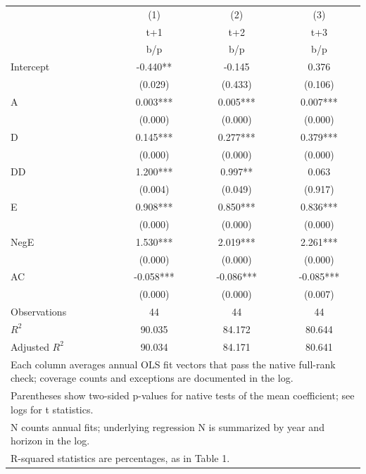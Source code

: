 {
\def\sym#1{\ifmmode^{#1}\else\(^{#1}\)\fi}
\begin{tabular}{l*{3}{c}}
\hline\hline
                    &\multicolumn{1}{c}{(1)}&\multicolumn{1}{c}{(2)}&\multicolumn{1}{c}{(3)}\\
                    &\multicolumn{1}{c}{t+1}&\multicolumn{1}{c}{t+2}&\multicolumn{1}{c}{t+3}\\
                    &         b/p   &         b/p   &         b/p   \\
\hline
Intercept           &      -0.440** &      -0.145   &       0.376   \\
                    &     (0.029)   &     (0.433)   &     (0.106)   \\
A                   &       0.003***&       0.005***&       0.007***\\
                    &     (0.000)   &     (0.000)   &     (0.000)   \\
D                   &       0.145***&       0.277***&       0.379***\\
                    &     (0.000)   &     (0.000)   &     (0.000)   \\
DD                  &       1.200***&       0.997** &       0.063   \\
                    &     (0.004)   &     (0.049)   &     (0.917)   \\
E                   &       0.908***&       0.850***&       0.836***\\
                    &     (0.000)   &     (0.000)   &     (0.000)   \\
NegE                &       1.530***&       2.019***&       2.261***\\
                    &     (0.000)   &     (0.000)   &     (0.000)   \\
AC                  &      -0.058***&      -0.086***&      -0.085***\\
                    &     (0.000)   &     (0.000)   &     (0.007)   \\
\hline
Observations        &          44   &          44   &          44   \\
\(R^{2}\)           &      90.035   &      84.172   &      80.644   \\
Adjusted \(R^{2}\)  &      90.034   &      84.171   &      80.641   \\
\hline\hline
\multicolumn{4}{l}{\footnotesize Each column averages annual OLS fit vectors that pass the native full-rank check; coverage counts and exceptions are documented in the log.}\\
\multicolumn{4}{l}{\footnotesize Parentheses show two-sided p-values for native tests of the mean coefficient; see logs for t statistics.}\\
\multicolumn{4}{l}{\footnotesize N counts annual fits; underlying regression N is summarized by year and horizon in the log.}\\
\multicolumn{4}{l}{\footnotesize R-squared statistics are percentages, as in Table 1.}\\
\end{tabular}
}
